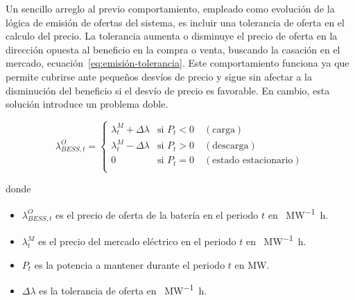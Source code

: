 Un sencillo arreglo al previo comportamiento, empleado como evolución de la lógica de emisión de ofertas del sistema, es incluir una tolerancia de oferta en el calculo del precio. La tolerancia aumenta o disminuye el precio de oferta en la dirección opuesta al beneficio en la compra o venta, buscando la casación en el mercado, ecuación~\ref{eq:emisión-tolerancia}. Este comportamiento funciona ya que permite cubrirse ante pequeños desvíos de precio y sigue sin afectar a la disminución del beneficio si el desvío de precio es favorable. En cambio, esta solución introduce un problema doble.

\begin{samepage}

  \begin{equation}
    \label{eq:emisión-tolerancia}
    \lambda^{O}_{BESS, t} =
    \begin{cases}
      \lambda^{M}_{t} + \Delta \lambda & \text{si } P_{t} < 0 \quad (\text{carga})       \\
      \lambda^{M}_{t} - \Delta \lambda & \text{si } P_{t} > 0 \quad (\text{descarga})    \\
      0                                & \text{si } P_{t} = 0 \quad (\text{estado estacionario}) \\
    \end{cases}
  \end{equation}

  donde

  \begin{itemize}

    \item \( \lambda^{O}_{BESS, t} \) es el precio de oferta de la batería en el periodo \( t \) en \si{\text{\euro}\per\mega\watt\hour}.

    \item \( \lambda^{M}_{t} \) es el precio del mercado eléctrico en el periodo \( t \) en \si{\text{\euro}\per\mega\watt\hour}.

    \item \( P_{t} \) es la potencia a mantener durante el periodo \( t \) en \si{\mega\watt}.

    \item \( \Delta \lambda \) es la tolerancia de oferta en \si{\text{\euro}\per\mega\watt\hour}.

  \end{itemize}

\end{samepage}


